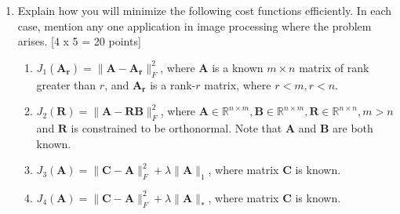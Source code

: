 \documentclass[11pt]{article}
\begin{document}
\begin{enumerate}
\item Explain how you will minimize the following cost functions efficiently. In each case, mention any one application in image processing where the problem arises.  \textsf{[4 x 5 = 20 points]}
\begin{enumerate}
\item $J_1(\boldsymbol{A_r}) = \|\boldsymbol{A}-\boldsymbol{A_r}\|^2_F$, where $\boldsymbol{A}$ is a known $m \times n$ matrix of rank greater than $r$, and $\boldsymbol{A_r}$ is a rank-$r$ matrix, where $r < m, r < n$. 
\item $J_2(\boldsymbol{R}) = \|\boldsymbol{A}-\boldsymbol{R} \boldsymbol{B}\|^2_F$, where $\boldsymbol{A} \in \mathbb{R}^{n \times m}, \boldsymbol{B} \in \mathbb{R}^{n \times m}, \boldsymbol{R} \in \mathbb{R}^{n \times n}, m > n$ and $\boldsymbol{R}$ is constrained to be orthonormal. Note that $\boldsymbol{A}$ and $\boldsymbol{B}$ are both known.
\item $J_3(\boldsymbol{A}) = \|\boldsymbol{C}-\boldsymbol{A}\|^2_F + \lambda \|\boldsymbol{A}\|_1$, where matrix $\boldsymbol{C}$ is known.
\item $J_4(\boldsymbol{A}) = \|\boldsymbol{C}-\boldsymbol{A}\|^2_F + \lambda \|\boldsymbol{A}\|_*$, where matrix $\boldsymbol{C}$ is known.
\end{enumerate}

\end{enumerate}
\end{document}
